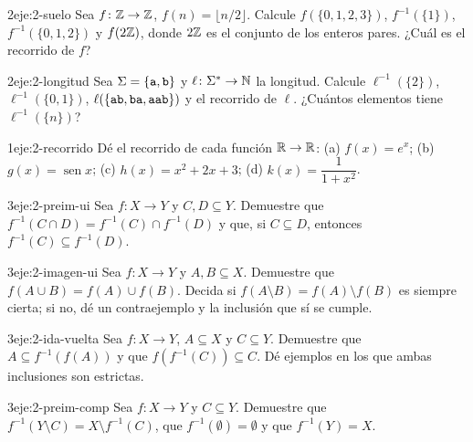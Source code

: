 \begin{ejercicio}{2}{eje:2-suelo}
Sea $f\colon\mathbb{Z}\to\mathbb{Z}$, $f(n)=\lfloor n/2\rfloor$. Calcule $f(\{0,1,2,3\})$, $f^{-1}(\{1\})$, $f^{-1}(\{0,1,2\})$ y $f(2\mathbb{Z})$, donde $2\mathbb{Z}$ es el conjunto de los enteros pares. ¿Cuál es el recorrido de $f$?
\end{ejercicio}

\begin{ejercicio}{2}{eje:2-longitud}
Sea $\Sigma=\{\texttt{a},\texttt{b}\}$ y $\ell\colon\Sigma^{*}\to\mathbb{N}$ la longitud. Calcule $\ell^{-1}(\{2\})$, $\ell^{-1}(\{0,1\})$, $\ell(\{\texttt{ab},\texttt{ba},\texttt{aab}\})$ y el recorrido de $\ell$. ¿Cuántos elementos tiene $\ell^{-1}(\{n\})$?
\end{ejercicio}

\begin{ejercicio}{1}{eje:2-recorrido}
Dé el recorrido de cada función $\mathbb{R}\to\mathbb{R}$: (a) $f(x)=e^{x}$; (b) $g(x)=\operatorname{sen}x$; (c) $h(x)=x^{2}+2x+3$; (d) $k(x)=\dfrac{1}{1+x^{2}}$.
\end{ejercicio}

\begin{ejercicio}{3}{eje:2-preim-ui}
Sea $f\colon X\to Y$ y $C,D\subseteq Y$. Demuestre que $f^{-1}(C\cap D)=f^{-1}(C)\cap f^{-1}(D)$ y que, si $C\subseteq D$, entonces $f^{-1}(C)\subseteq f^{-1}(D)$.
\end{ejercicio}

\begin{ejercicio}{3}{eje:2-imagen-ui}
Sea $f\colon X\to Y$ y $A,B\subseteq X$. Demuestre que $f(A\cup B)=f(A)\cup f(B)$. Decida si $f(A\setminus B)=f(A)\setminus f(B)$ es siempre cierta; si no, dé un contraejemplo y la inclusión que sí se cumple.
\end{ejercicio}

\begin{ejercicio}{3}{eje:2-ida-vuelta}
Sea $f\colon X\to Y$, $A\subseteq X$ y $C\subseteq Y$. Demuestre que $A\subseteq f^{-1}(f(A))$ y que $f(f^{-1}(C))\subseteq C$. Dé ejemplos en los que ambas inclusiones son estrictas.
\end{ejercicio}

\begin{ejercicio}{3}{eje:2-preim-comp}
Sea $f\colon X\to Y$ y $C\subseteq Y$. Demuestre que $f^{-1}(Y\setminus C)=X\setminus f^{-1}(C)$, que $f^{-1}(\emptyset)=\emptyset$ y que $f^{-1}(Y)=X$.
\end{ejercicio}

